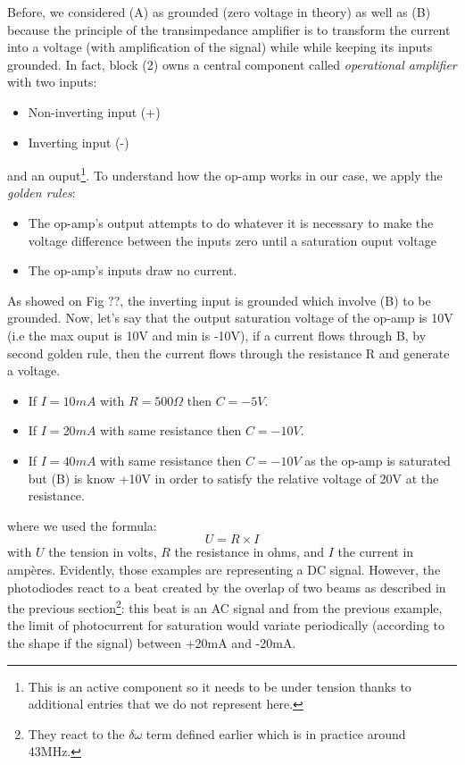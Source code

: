 \documentclass[10pt]{report}
\begin{document}
Before, we considered (A) as grounded (zero voltage in theory) as well as (B) because the principle of the transimpedance amplifier is to transform the current into a voltage (with amplification of the signal) while while keeping its inputs grounded. In fact, block (2) owns a central component called \textit{operational amplifier} with two inputs:
\begin{itemize}
 \item Non-inverting input (+)
 \item Inverting input (-)
\end{itemize}
and an ouput\footnote{This is an active component so it needs to be under tension thanks to additional entries that we do not represent here.}. To understand how the op-amp works in our case, we apply the \textit{golden rules}:
\begin{itemize}
 \item The op-amp's output attempts to do whatever it is necessary to make the voltage difference between the inputs zero until a saturation ouput voltage
 \item The op-amp's inputs draw no current.
\end{itemize} As showed on Fig ??, the inverting input is grounded which involve (B) to be grounded. Now, let's say that the output saturation voltage of the op-amp is 10V (i.e the max ouput is 10V and min is -10V), if a current flows through B, by second golden rule, then the current flows through the resistance R and generate a voltage.
\begin{itemize}
	\item If $I = 10mA$ with $R = 500\Omega$ then $C = -5V$.
	\item If $I = 20mA$ with same resistance then $C = -10V$.
	\item If $I = 40mA$ with same resistance then $C = -10V$ as the op-amp is saturated but (B) is know +10V in order to satisfy the relative voltage of 20V at the resistance.
\end{itemize}
where we used the formula:
\begin{equation}
\label{ueqri}
U = R \times I
\end{equation}
with $U$ the tension in volts, $R$ the resistance in ohms, and $I$ the current in ampères. Evidently, those examples are representing a DC signal. However, the photodiodes react to a beat created by the overlap of two beams as described in the previous section\footnote{They react to the $\delta\omega$ term defined earlier which is in practice around 43MHz.}: this beat is an AC signal and from the previous example, the limit of photocurrent for saturation would variate periodically (according to the shape if the signal) between +20mA and -20mA.
\end{document}
